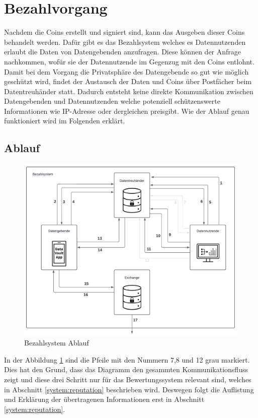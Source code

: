 \documentclass{scrreprt}
\begin{document}
\section{Bezahlvorgang}
\label{system:payment}
Nachdem die Coins erstellt und signiert sind, kann das Ausgeben dieser Coins  behandelt werden. Dafür gibt es das Bezahlsystem welches es Datennutzenden erlaubt die Daten von Datengebenden anzufragen. Diese können der Anfrage nachkommen, wofür sie der Datennutzende im Gegenzug mit den Coins entlohnt. Damit bei dem Vorgang die Privatsphäre des Datengebende so gut wie möglich geschützt wird, findet der Austausch der Daten und Coins über Postfächer beim Datentreuhänder statt. Dadurch entsteht keine direkte Kommunikation zwischen Datengebenden und Datennutzenden welche potenziell schützenswerte Informationen wie IP-Adresse oder dergleichen preisgibt. Wie der Ablauf genau funktioniert wird im Folgenden erklärt.

\subsection{Ablauf}
\begin{figure}[H]
    \centering
    \includegraphics[width=0.9\linewidth]{PaymentDiagramm.pdf}
    \caption{Bezahlsystem Ablauf}
    \label{fig:payment}
\end{figure} 

In der Abbildung \ref{fig:payment} sind die Pfeile mit den Nummern 7,8 und 12 grau markiert. Dies hat den Grund, dass das Diagramm den gesammten Kommunikationsfluss zeigt und diese drei Schritt nur für das Bewertungssystem relevant sind, welches in Abschnitt \ref{system:reputation} beschrieben wird. Deswegen folgt die Auflistung und Erklärung der übertragenen Informationen erst in Abschnitt \ref{system:reputation}.
\end{document}
